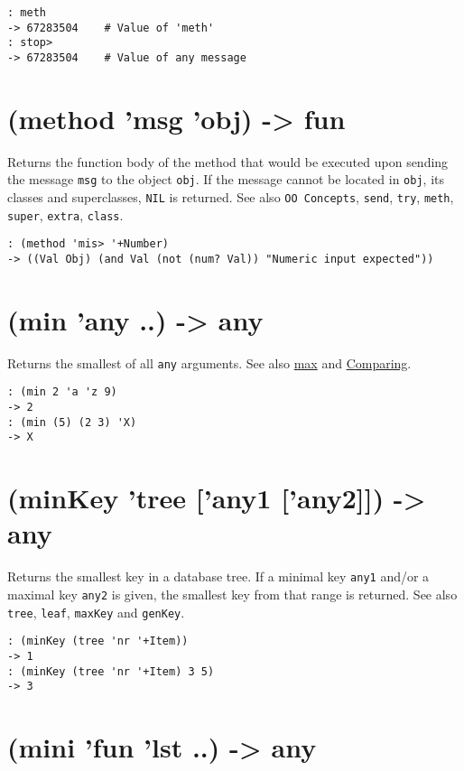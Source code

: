 {{{{{{{\begin{verbatim}
: meth
-> 67283504    # Value of 'meth'
: stop>
-> 67283504    # Value of any message
\end{verbatim}

 
\section{(method 'msg 'obj) -> fun}
\label{sec-8-1-13-25}


Returns the function body of the method that would be executed upon
sending the message \texttt{msg} to the object \texttt{obj}. If the message cannot be
located in \texttt{obj}, its classes and superclasses, \texttt{NIL} is returned. See
also \texttt{OO Concepts}, \texttt{send}, \texttt{try}, \texttt{meth}, \texttt{super}, \texttt{extra}, \texttt{class}.


\begin{verbatim}
: (method 'mis> '+Number)
-> ((Val Obj) (and Val (not (num? Val)) "Numeric input expected"))
\end{verbatim}

 
\section{(min 'any ..) -> any}
\label{sec-8-1-13-26}


Returns the smallest of all \texttt{any} arguments. See also
\hyperref[refM.html-max]{max} and \hyperref[ref.html-cmp]{Comparing}.


\begin{verbatim}
: (min 2 'a 'z 9)
-> 2
: (min (5) (2 3) 'X)
-> X
\end{verbatim}

 
\section{(minKey 'tree ['any1 ['any2]]) -> any}
\label{sec-8-1-13-27}


Returns the smallest key in a database tree. If a minimal key \texttt{any1}
and/or a maximal key \texttt{any2} is given, the smallest key from that range
is returned. See also \texttt{tree}, \texttt{leaf}, \texttt{maxKey} and \texttt{genKey}.


\begin{verbatim}
: (minKey (tree 'nr '+Item))
-> 1
: (minKey (tree 'nr '+Item) 3 5)
-> 3
\end{verbatim}

 
\section{(mini 'fun 'lst ..) -> any}
\label{sec-8-1-13-28}


}}}}}}}
